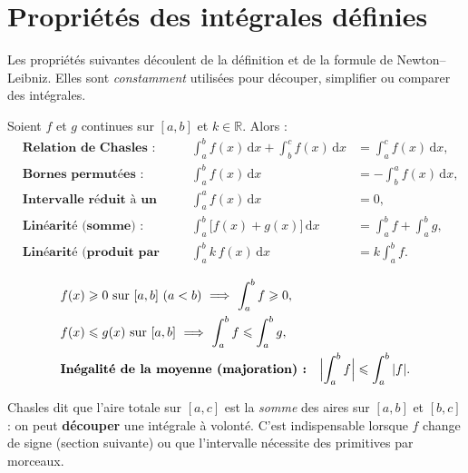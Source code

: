 \documentclass[11pt,a4paper]{article}
\newcommand{\dd}{\mathrm{d}}
\newcommand{\R}{\mathbb{R}}
\begin{document}
\section{Propriétés des intégrales définies}

Les propriétés suivantes découlent de la définition et de la formule de Newton--Leibniz. Elles
sont \emph{constamment} utilisées pour découper, simplifier ou comparer des intégrales.

\begin{theoreme}
Soient $f$ et $g$ continues sur $[a,b]$ et $k\in\R$. Alors :
\begin{align}
&\textbf{Relation de Chasles :}\quad &\int_a^b f(x)\,\dd x+\int_b^c f(x)\,\dd x &=\int_a^c f(x)\,\dd x,\\
&\textbf{Bornes permutées :}\quad &\int_a^b f(x)\,\dd x &=-\int_b^a f(x)\,\dd x,\\
&\textbf{Intervalle réduit à un point :}\quad &\int_a^a f(x)\,\dd x &=0,\\
&\textbf{Linéarité (somme) :}\quad &\int_a^b \bigl[f(x)+g(x)\bigr]\,\dd x &=\int_a^b f+\int_a^b g,\\
&\textbf{Linéarité (produit par une constante) :}\quad &\int_a^b k\,f(x)\,\dd x &=k\int_a^b f.
\end{align}
\end{theoreme}

\begin{theoreme}
\begin{align}
&f(x)\geqslant 0\ \text{sur }[a,b]\ (a<b)\ \Longrightarrow\ \int_a^b f\geqslant 0,\\
&f(x)\leqslant g(x)\ \text{sur }[a,b]\ \Longrightarrow\ \int_a^b f\leqslant\int_a^b g,\\
&\textbf{Inégalité de la moyenne (majoration) :}\quad \Bigl|\int_a^b f\Bigr|\leqslant\int_a^b|f|.
\end{align}
\end{theoreme}

\begin{remarque}
Chasles dit que l'aire totale sur $[a,c]$ est la \emph{somme} des aires sur $[a,b]$ et $[b,c]$ :
on peut \textbf{découper} une intégrale à volonté. C'est indispensable lorsque $f$ change de
signe (section suivante) ou que l'intervalle nécessite des primitives par morceaux.
\end{remarque}
\end{document}
